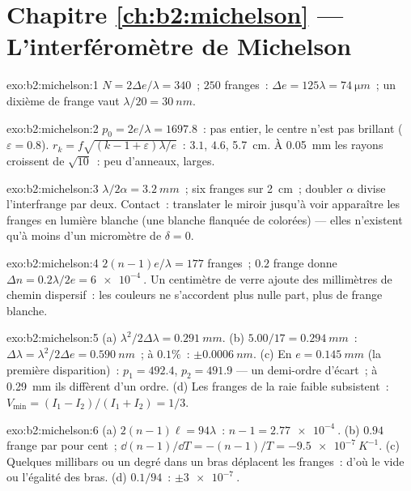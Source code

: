 \section*{Chapitre \ref{ch:b2:michelson} --- L'interféromètre de Michelson}

\begin{solution}{exo:b2:michelson:1}
$N = 2\Delta e/\lambda = 340$~; $250$ franges~: $\Delta e = 125\lambda = \qty{74}{\micro m}$~; un dixième de
frange vaut $\lambda/20 = \qty{30}{nm}$.
\end{solution}

\begin{solution}{exo:b2:michelson:2}
$p_0 = 2e/\lambda = 1697.8$~: pas entier, le centre n'est pas brillant ($\varepsilon =
0.8$). $r_k = f\sqrt{(k - 1 + \varepsilon)\lambda/e}$~: $3.1$, $4.6$, \qty{5.7}{cm}. À \qty{0.05}{mm} les
rayons croissent de $\sqrt{10}$~: peu d'anneaux, larges.
\end{solution}

\begin{solution}{exo:b2:michelson:3}
$\lambda/2\alpha = \qty{3.2}{mm}$~; six franges sur \qty{2}{cm}~; doubler $\alpha$ divise l'interfrange
par deux. Contact~: translater le miroir jusqu'à voir apparaître les franges en lumière blanche
(une blanche flanquée de colorées) --- elles n'existent qu'à
moins d'un micromètre de $\delta = 0$.
\end{solution}

\begin{solution}{exo:b2:michelson:4}
$2(n - 1)e/\lambda = 177$ franges~; $0.2$ frange donne $\Delta n = 0.2\lambda/2e = \qty{6e-4}{}$.
Un centimètre de verre ajoute des millimètres de chemin dispersif~: les couleurs
ne s'accordent plus nulle part, plus de frange blanche.
\end{solution}

\begin{solution}{exo:b2:michelson:5}
(a) $\lambda^2/2\Delta\lambda = \qty{0.291}{mm}$. (b) $5.00/17 = \qty{0.294}{mm}$~: $\Delta\lambda = \lambda^2/2\Delta e =
\qty{0.590}{nm}$~; à $0.1\%$~: $\pm\qty{0.0006}{nm}$. (c) En $e = \qty{0.145}{mm}$ (la première
disparition)~: $p_1 = 492.4$, $p_2 = 491.9$ --- un demi-ordre d'écart~; à
\qty{0.29}{mm} ils diffèrent d'un ordre. (d) Les franges de la raie faible subsistent~: $V_{\min} =
(I_1 - I_2)/(I_1 + I_2) = 1/3$.
\end{solution}

\begin{solution}{exo:b2:michelson:6}
(a) $2(n - 1)\ell = 94\lambda$~: $n - 1 = \qty{2.77e-4}{}$. (b) $0.94$ frange par pour cent~;
$\dd(n - 1)/\dd T = -(n - 1)/T = \qty{-9.5e-7}{K^{-1}}$. (c) Quelques millibars ou un
degré dans un bras déplacent les franges~: d'où le vide ou l'égalité des bras. (d)
$0.1/94$~: $\pm\qty{3e-7}{}$.
\end{solution}

